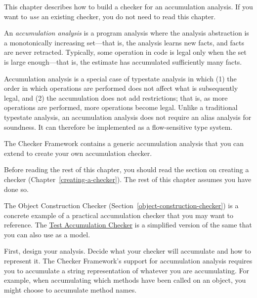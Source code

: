 \htmlhr
{}


This chapter describes how to build a checker for an accumulation analysis.
If you want to \emph{use} an existing checker, you do not need to read this chapter.

An \emph{accumulation analysis} is a program analysis where the
analysis abstraction is a monotonically increasing set---that is, the
analysis learns new facts, and facts are never retracted.
Typically, some operation in code is legal
only when the set is large enough---that is, the estimate has accumulated
sufficiently many facts.

Accumulation analysis is a special case of typestate analysis in which
(1) the order in which operations are performed does not affect what is subsequently legal,
and (2) the accumulation does not add restrictions; that is, as
more operations are performed, more operations become legal.
Unlike a traditional typestate analysis, an accumulation analysis does
not require an alias analysis for soundness. It can therefore be implemented
as a flow-sensitive type system.

The Checker Framework contains a generic accumulation analysis that you can
extend to create your own accumulation checker.

Before reading the rest of this chapter, you should
read the section on creating a checker (Chapter~\ref{creating-a-checker}).
The rest of this chapter assumes you have done so.



The Object Construction Checker (Section~\ref{object-construction-checker})
is a concrete example of a practical accumulation checker that you may want
to reference. The
\href{https://github.com/typetools/checker-framework/blob/master/framework/src/test/java/testaccumulation/TestAccumulationChecker.java}{Test Accumulation Checker}
is a simplified version of the same that you can also use as a model.

First, design your analysis.  Decide what
your checker will accumulate and how to represent it. The Checker Framework's
support for accumulation analysis requires you to accumulate a string representation
of whatever you are accumulating. For example, when accumulating which methods have
been called on an object, you might choose to accumulate method names.

